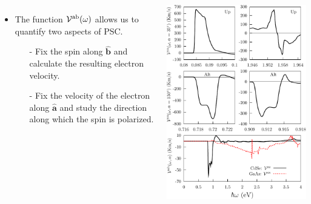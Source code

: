 \documentclass{beamer}
\begin{document}
\begin{frame}

{\small


\begin{columns}



\begin{itemize}

\item 
The function ${\cal V}^{\mathrm{a}\mathrm{b}}(\omega)$ allows us to quantify
two aspects of PSC. 


\begin{itemize}

\item[-]
Fix the spin along $\hat{\mathbf{b}}$ and calculate the resulting electron
velocity.

\item[-] 
Fix the velocity of the electron along $\hat{\mathbf{a}}$ and study the
direction along which the spin is polarized.
\end{itemize}

\end{itemize}


\includegraphics[width=1.0\textwidth]{figs/vcomp.pdf}

\end{columns}


}
\end{frame}
\end{document}
